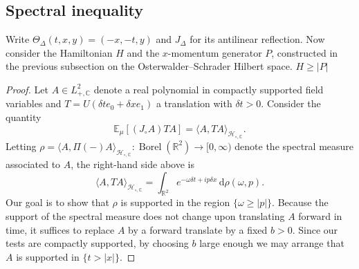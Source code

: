 \documentclass[11pt, letterpaper, reqno]{amsart}
\theoremstyle{definition}
\newenvironment{proposition}
{\pushQED{\qed}\renewcommand{\qedsymbol}{$\blacksquare$}\propositionx}
{\popQED\endpropositionx}
\theoremstyle{remark}
\newcommand{\bbC}{\mathbb{C}}
\newcommand{\bbE}{\mathbb{E}}
\newcommand{\bbR}{\mathbb{R}}
\newcommand{\calH}{\mathcal{H}}
\newcommand{\dd}{\,\mathrm{d}}
\begin{document}
\subsection{Spectral inequality}
Write $\Theta_\Delta(t,x,y)=(-x,-t,y)$ and $J_\Delta$ for its
antilinear reflection. Now consider the Hamiltonian $H$ and the
$x$-momentum generator $P$, constructed in the previous subsection
on the Osterwalder--Schrader Hilbert space.
\begin{proposition}\label{prop:cone}
    $H\geq |P|$
\end{proposition}
\begin{proof}
    Let $A\in L^2_{+,\bbC}$ denote a real polynomial in compactly supported field variables and $T=U(\delta t e_0+\delta x e_1)$ a translation with $\delta t>0$. Consider the quantity 
    \begin{equation}
        \bbE_\mu [(J_\circ A) T A]=\langle A,TA\rangle_{\calH_{\circ,\bbC}}.
    \end{equation}
    Letting $\rho = \langle A,  \Pi(-) A \rangle_{\calH_{\circ,\bbC}} :\operatorname{Borel}(\bbR^2)\to [0,\infty)$ denote the spectral measure associated to $A$, the right-hand side above is 
    \begin{equation}
        \langle A,T A \rangle_{\calH_{\circ,\bbC}} =  \int_{\bbR^2} e^{-\omega \delta t + i p \delta x} \dd \rho(\omega, p).
    \end{equation}
    Our goal is to show that $\rho$ is supported in the region $\{\omega\geq |p|\}$. Because the support of the spectral measure does not change upon translating $A$ forward in time, it suffices to replace $A$ by a 
    forward translate by a fixed $b>0$. Since our tests are compactly supported, by choosing $b$ large enough we may arrange that $A$ is supported in $\{t>|x|\}$. 


\end{proof}
\end{document}
